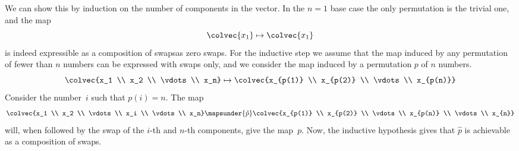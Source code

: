 \begin{ans}{5}
      We can show this by induction on the number of components in the
      vector.
      In the $n=1$ base case the only permutation is the trivial one,
      and the map
      \begin{equation*}
        \colvec{x_1}
        \mapsto
        \colvec{x_1}
      \end{equation*}
      is indeed expressible as a composition of swaps\Dash as zero swaps.
      For the inductive step we assume that the map induced by
      any permutation of fewer than
      $n$ numbers can be expressed with swaps only, and we consider the map
      induced by a
      permutation $p$ of $n$ numbers.
      \begin{equation*}
        \colvec{x_1 \\ x_2 \\ \vdots \\ x_n}
        \mapsto
        \colvec{x_{p(1)} \\ x_{p(2)} \\ \vdots \\ x_{p(n)}}
      \end{equation*}
      Consider the number~$i$ such that $p(i)=n$.
      The map
      \begin{equation*}
        \colvec{x_1      \\ x_2      \\ \vdots \\ x_i      \\ \vdots \\ x_n}
        \mapsunder{\hat{p}}
        \colvec{x_{p(1)} \\ x_{p(2)} \\ \vdots \\ x_{p(n)} \\ \vdots  \\ x_{n}}
      \end{equation*}
      will, when followed by the swap of the $i$-th and $n$-th components,
      give the map~$p$.
      Now, the inductive hypothesis gives that $\hat{p}$ is achievable as
      a composition of swaps.
    
\end{ans}
